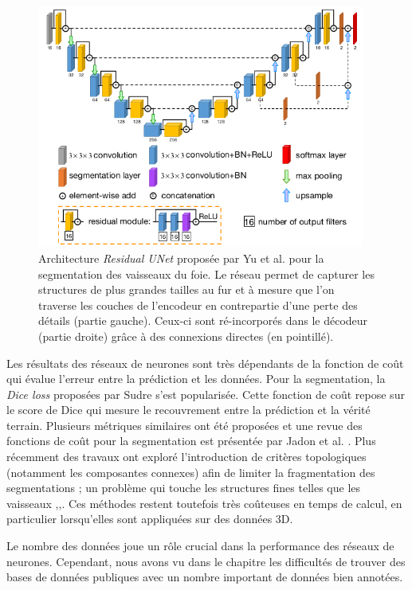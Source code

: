       \begin{figure}[!ht]
        \centering
        \includegraphics[height=8cm]{Images/Residual_Unet_Yu.png}
        \caption{Architecture \textit{Residual UNet} proposée par Yu et al. \cite{yu2019_liver_ResUnet} pour la segmentation des vaisseaux du foie. Le réseau permet de capturer les structures de plus grandes tailles au fur et à mesure que l'on traverse les couches de l'encodeur en contrepartie d'une perte des détails (partie gauche). Ceux-ci sont ré-incorporés dans le décodeur (partie droite) grâce à des connexions directes (en pointillé). }
        \label{fig:yu_resunet}
      \end{figure}
      
      Les résultats des réseaux de neurones sont très dépendants de la fonction de coût qui évalue l'erreur entre la prédiction et les données. Pour la segmentation, la \textit{Dice loss} proposées par Sudre \cite{Sudre2017_DiceLoss} s'est popularisée. Cette fonction de coût repose sur le score de Dice qui mesure le recouvrement entre la prédiction et la vérité terrain. Plusieurs métriques similaires ont été proposées et une revue des fonctions de coût pour la segmentation est présentée par Jadon et al. \cite{Jadon2020_survey_seg_loss}. Plus récemment des travaux ont exploré l'introduction de critères topologiques (notamment les composantes connexes) afin de limiter la fragmentation des segmentations ; un problème qui touche les structures fines telles que les vaisseaux \cite{Ventura2017iterative_topo},\cite{Hu2019_topo_homo_persi},\cite{Clough2019_topo_homo_persi}. Ces méthodes restent toutefois très coûteuses en temps de calcul, en particulier lorsqu'elles sont appliquées sur des données 3D. 

      Le nombre des données joue un rôle crucial dans la performance des réseaux de neurones. Cependant, nous avons vu dans le chapitre \chapContextN les difficultés de trouver des bases de données publiques avec un nombre important de données bien annotées. 


